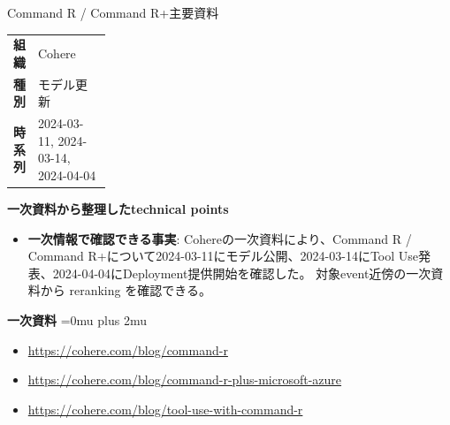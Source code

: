 \Needspace{0.38\textheight}
\begin{technicalnote}{Command R / Command R+}{主要資料}
\begingroup
\begin{tabularx}{\linewidth}{@{}>{\bfseries}p{0.22\linewidth}X@{}}
組織 & Cohere \\
種別 & モデル更新 \\
時系列 & 2024-03-11, 2024-03-14, 2024-04-04 \\
\end{tabularx}
\smallskip
\begin{minipage}{\linewidth}
{\bfseries 一次資料から整理したtechnical points}
\begin{itemize}[leftmargin=1.5em,itemsep=0.35em]
\item \textbf{一次情報で確認できる事実}: Cohereの一次資料により、Command R / Command R+について2024-03-11にモデル公開、2024-03-14にTool Use発表、2024-04-04にDeployment提供開始を確認した。 対象event近傍の一次資料から reranking を確認できる。
\end{itemize}
\begin{minipage}{\linewidth}
\begin{samepage}
{\bfseries 一次資料}
\begingroup\sloppy
\Urlmuskip=0mu plus 2mu\relax
\begin{itemize}[leftmargin=1.5em,itemsep=0.25em]
\item {\scriptsize\url{https://cohere.com/blog/command-r}}
\item {\scriptsize\url{https://cohere.com/blog/command-r-plus-microsoft-azure}}
\item {\scriptsize\url{https://cohere.com/blog/tool-use-with-command-r}}
\end{itemize}
\endgroup
\end{samepage}
\end{minipage}
\end{minipage}
\endgroup
\end{technicalnote}
\medskip

